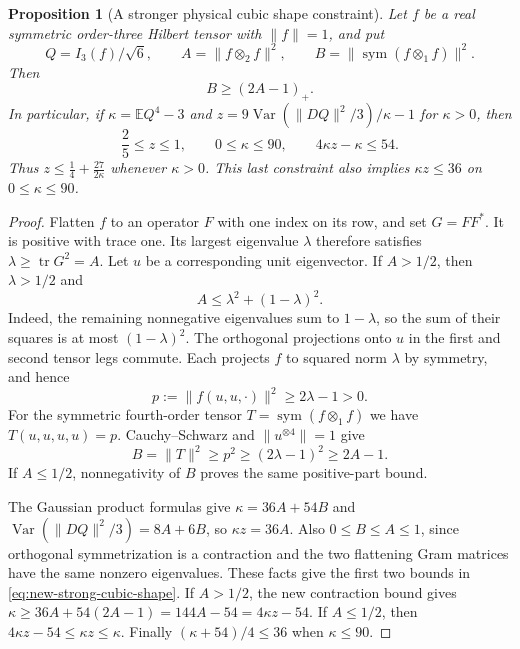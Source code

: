 \documentclass[11pt]{article}
\newtheorem{proposition}[theorem]{Proposition}
\begin{document}
\begin{proposition}[A stronger physical cubic shape constraint]
\label{prop:new-strong-cubic-shape}
Let $f$ be a real symmetric order-three Hilbert tensor with $\|f\|=1$,
and put
\[
 Q=I_3(f)/\sqrt6,\qquad
 A=\|f\otimes_2f\|^2,\qquad
 B=\|\operatorname{sym}(f\otimes_1f)\|^2.
\]
Then
\begin{equation}\label{eq:new-strong-cubic-contraction}
 B\geq(2A-1)_+.
\end{equation}
In particular, if $\kappa=\mathbb E Q^4-3$ and
$z=9\operatorname{Var}(\|DQ\|^2/3)/\kappa-1$ for $\kappa>0$, then
\begin{equation}\label{eq:new-strong-cubic-shape}
 \frac25\leq z\leq1,\qquad 0\leq\kappa\leq90,
 \qquad 4\kappa z-\kappa\leq54.
\end{equation}
Thus $z\leq\tfrac14+\tfrac{27}{2\kappa}$ whenever $\kappa>0$.
This last constraint also implies $\kappa z\leq36$ on
$0\leq\kappa\leq90$.
\end{proposition}
\begin{proof}
Flatten $f$ to an operator $F$ with one index on its row, and set
$G=FF^*$.  It is positive with trace one.  Its largest eigenvalue
$\lambda$ therefore satisfies
$\lambda\geq\operatorname{tr}G^2=A$.  Let $u$ be a corresponding
unit eigenvector.  If $A>1/2$, then $\lambda>1/2$ and
\[
 A\leq\lambda^2+(1-\lambda)^2.
\]
Indeed, the remaining nonnegative eigenvalues sum to $1-\lambda$,
so the sum of their squares is at most $(1-\lambda)^2$.
The orthogonal projections onto $u$ in the first and second tensor
legs commute.  Each projects $f$ to squared norm $\lambda$ by
symmetry, and hence
\[
 p:=\|f(u,u,\cdot)\|^2\geq2\lambda-1>0.
\]
For the symmetric fourth-order tensor
$T=\operatorname{sym}(f\otimes_1f)$ we have
$T(u,u,u,u)=p$.  Cauchy--Schwarz and $\|u^{\otimes4}\|=1$ give
\[
 B=\|T\|^2\geq p^2\geq(2\lambda-1)^2\geq2A-1.
\]
If $A\leq1/2$, nonnegativity of $B$ proves the same positive-part
bound.

The Gaussian product formulas give
$\kappa=36A+54B$ and
$\operatorname{Var}(\|DQ\|^2/3)=8A+6B$, so $\kappa z=36A$.
Also $0\leq B\leq A\leq1$, since orthogonal symmetrization is a
contraction and the two flattening Gram matrices have the same
nonzero eigenvalues.  These facts give the first two bounds in
\eqref{eq:new-strong-cubic-shape}.  If $A>1/2$, the new contraction
bound gives
$\kappa\geq36A+54(2A-1)=144A-54=4\kappa z-54$.
If $A\leq1/2$, then $4\kappa z-54\leq\kappa z\leq\kappa$.
Finally $(\kappa+54)/4\leq36$ when $\kappa\leq90$.
\end{proof}
\end{document}
